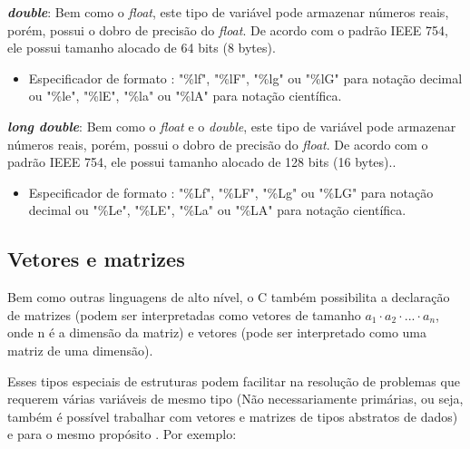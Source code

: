\documentclass[12pt]{article}
\newcommand\tab[1][1cm]{\hspace*{#1}}
\begin{document}
\hspace{0.2cm}
\par\textbf{\textit{double}}: Bem como o \textit{float}, este tipo de variável pode armazenar números reais, porém, possui o dobro de precisão do \textit{float}. De acordo com o padrão IEEE 754, ele possui tamanho alocado de 64 bits (8 bytes).\cite{wiki:c_data_types}

\begin{itemize}
    \item Especificador de formato : "\%lf", "\%lF", "\%lg" ou "\%lG" para notação decimal ou "\%le", "\%lE", "\%la" ou "\%lA" para notação científica.
\end{itemize}

\hspace{0.2cm}
\par\textbf{\textit{long double}}: Bem como o \textit{float} e o \textit{double}, este tipo de variável pode armazenar números reais, porém, possui o dobro de precisão do \textit{float}. De acordo com o padrão IEEE 754, ele possui tamanho alocado de 128 bits (16 bytes).\cite{wiki:c_data_types}.

\begin{itemize}
    \item Especificador de formato : "\%Lf", "\%LF", "\%Lg" ou "\%LG" para notação decimal ou "\%Le", "\%LE", "\%La" ou "\%LA" para notação científica.
\end{itemize}

\newpage

\subsection{Vetores e matrizes}

\par\tab Bem como outras linguagens de alto nível, o C também possibilita a declaração de matrizes (podem ser interpretadas como vetores de tamanho $a_1 \cdot a_2 \cdot ... \cdot a_n$, onde n é a dimensão da matriz) e vetores (pode ser interpretado como uma matriz de uma dimensão).
\par\tab Esses tipos especiais de estruturas podem facilitar na resolução de problemas que requerem várias variáveis de mesmo tipo (Não necessariamente primárias, ou seja, também é possível trabalhar com vetores e matrizes de tipos abstratos de dados) e para o mesmo propósito \cite{presentation:pe_vet_func}. Por exemplo:
\end{document}
